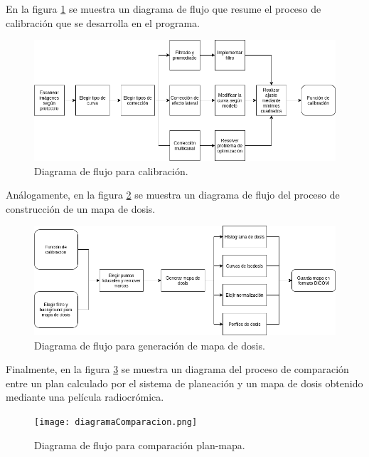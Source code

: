 En la figura \ref{fig:diagramacalibracion} se muestra un diagrama de flujo que resume el proceso de calibración que se desarrolla en el programa.\\
\begin{figure}[H]
	\centering
	\includegraphics[width=\linewidth]{images/daigramaFlujo.png}
	\caption{Diagrama de flujo para calibración. }
	\label{fig:diagramacalibracion}
\end{figure}
Análogamente, en la figura \ref{fig:diagramaMapa} se muestra un diagrama de flujo del proceso de construcción de un mapa de dosis.\\
\begin{figure}[H]
	\centering
	\includegraphics[width=\linewidth]{images/daigramaMapaDosis2.png}
	\caption{Diagrama de flujo para generación de mapa de dosis. }
	\label{fig:diagramaMapa}
\end{figure}
Finalmente, en la figura \ref{fig:diagramaComparacion} se muestra un diagrama del proceso de comparación entre un plan calculado por el sistema de planeación y un mapa de dosis obtenido mediante una película radiocrómica.
\begin{figure}[H]
	\centering
	\texttt{[image: diagramaComparacion.png]}
	\caption{Diagrama de flujo para comparación plan-mapa. }
	\label{fig:diagramaComparacion}
\end{figure}